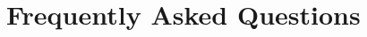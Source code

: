 \section{Frequently Asked Questions}

\ifscreen
\newenvironment{faqa}[2]{%
  \begin{list}{}{}%
  \item[\hypertarget{#1}{\colorbox{lightblue}{\textbf{#2}}}]}{\end{list}}
\else
\newenvironment{faqa}[2]{%
  \begin{list}{}{}%
  \item[\hypertarget{#1}{\textbf{#2}}]}{\end{list}}
\fi

